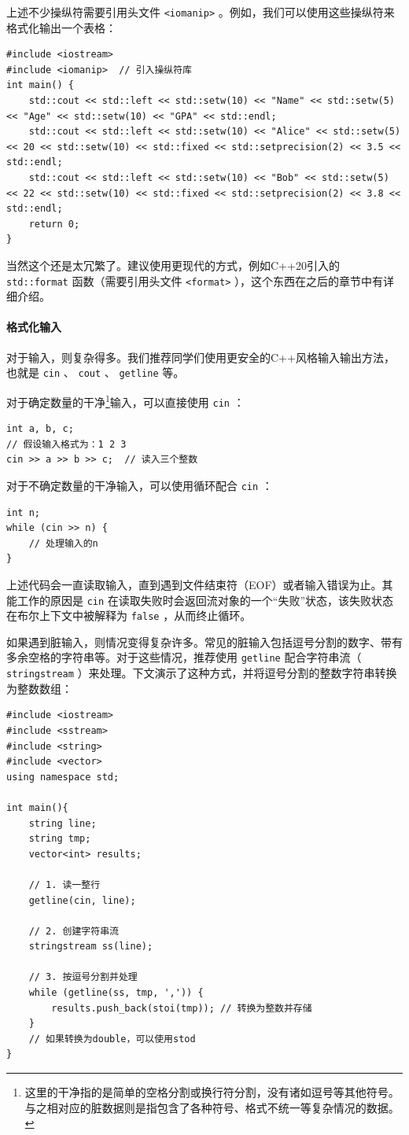上述不少操纵符需要引用头文件 \texttt{<iomanip>} 。例如，我们可以使用这些操纵符来格式化输出一个表格：
\begin{verbatim}
#include <iostream>
#include <iomanip>  // 引入操纵符库
int main() {
    std::cout << std::left << std::setw(10) << "Name" << std::setw(5) << "Age" << std::setw(10) << "GPA" << std::endl;
    std::cout << std::left << std::setw(10) << "Alice" << std::setw(5) << 20 << std::setw(10) << std::fixed << std::setprecision(2) << 3.5 << std::endl;
    std::cout << std::left << std::setw(10) << "Bob" << std::setw(5) << 22 << std::setw(10) << std::fixed << std::setprecision(2) << 3.8 << std::endl;
    return 0;
}
\end{verbatim}
当然这个还是太冗繁了。建议使用更现代的方式，例如C++20引入的 \texttt{std::format} 函数（需要引用头文件 \texttt{<format>} ），这个东西在之后的章节中有详细介绍。

\paragraph{格式化输入}

对于输入，则复杂得多。我们推荐同学们使用更安全的C++风格输入输出方法，也就是 \texttt{cin} 、 \texttt{cout} 、 \texttt{getline} 等。

对于确定数量的干净\footnote{这里的干净指的是简单的空格分割或换行符分割，没有诸如逗号等其他符号。与之相对应的脏数据则是指包含了各种符号、格式不统一等复杂情况的数据。}输入，可以直接使用 \texttt{cin} ：
\begin{verbatim}
int a, b, c;
// 假设输入格式为：1 2 3
cin >> a >> b >> c;  // 读入三个整数
\end{verbatim}

对于不确定数量的干净输入，可以使用循环配合 \texttt{cin} ：
\begin{verbatim}
int n;
while (cin >> n) {
    // 处理输入的n
}
\end{verbatim}
上述代码会一直读取输入，直到遇到文件结束符（EOF）或者输入错误为止。其能工作的原因是 \texttt{cin} 在读取失败时会返回流对象的一个“失败”状态，该失败状态在布尔上下文中被解释为 \texttt{false} ，从而终止循环。

如果遇到脏输入，则情况变得复杂许多。常见的脏输入包括逗号分割的数字、带有多余空格的字符串等。对于这些情况，推荐使用 \texttt{getline} 配合字符串流（ \texttt{stringstream} ）来处理。下文演示了这种方式，并将逗号分割的整数字符串转换为整数数组：
\begin{verbatim}
#include <iostream>
#include <sstream>
#include <string>
#include <vector>
using namespace std;

int main(){
    string line;
    string tmp;
    vector<int> results;

    // 1. 读一整行
    getline(cin, line);

    // 2. 创建字符串流
    stringstream ss(line);

    // 3. 按逗号分割并处理
    while (getline(ss, tmp, ',')) {
        results.push_back(stoi(tmp)); // 转换为整数并存储
    }
    // 如果转换为double，可以使用stod
}
\end{verbatim}

